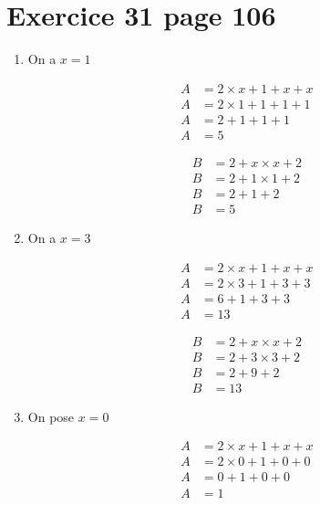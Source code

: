\documentclass[12pt,a4paper]{article}
\begin{document}
\newpage

\section*{Exercice 31 page 106}


\begin{enumerate}
	\item On a $x= 1$
	
	\begin{multicols}{2}
		\begin{align*}
			A &= 2 \times x +1 +x + x\\
			A &= 2 \times 1 +1 +1 + 1\\
			A &= 2 +1 +1 + 1\\
			A &= 5
		\end{align*}
		
		\begin{align*}
			B &= 2 + x \times x + 2\\
			B &= 2 + 1 \times 1 + 2\\
			B &= 2 + 1 + 2\\
			B &= 5
		\end{align*}
	
		
	\end{multicols}
	
	
	\item On a $x= 3$
	
	\begin{multicols}{2}
		\begin{align*}
			A &= 2 \times x +1 +x + x\\
			A &= 2 \times 3 +1 +3 + 3\\
			A &= 6 +1 +3 + 3\\
			A &= 13
		\end{align*}
		
		\begin{align*}
			B &= 2 + x \times x + 2\\
			B &= 2 + 3 \times 3 + 2\\
			B &= 2 + 9 + 2\\
			B &= 13
		\end{align*}
		
		
	\end{multicols}
	
	\item On pose $x= 0$
	
	\begin{multicols}{2}
		\begin{align*}
			A &= 2 \times x +1 +x + x\\
			A &= 2 \times 0 +1 +0 + 0\\
			A &= 0 +1 +0 + 0\\
			A &= 1
		\end{align*}
		

\end{multicols}
\end{enumerate}
\end{document}
